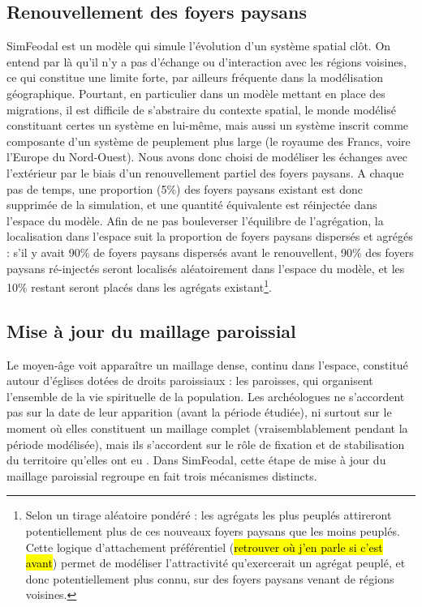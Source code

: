\subsection{Renouvellement des foyers paysans \label{meca-renouvellement}}

SimFeodal est un modèle qui simule l'évolution d'un système spatial clôt.
On entend par là qu'il n'y a pas d'échange ou d'interaction avec les régions voisines, ce qui constitue une limite forte, par ailleurs fréquente dans la modélisation géographique.
Pourtant, en particulier dans un modèle mettant en place des migrations, il est difficile de s'abstraire du contexte spatial, le monde modélisé constituant certes un système en lui-même, mais aussi un système inscrit comme composante d'un système de peuplement plus large (le royaume des Francs, voire l'Europe du Nord-Ouest).
Nous avons donc choisi de modéliser les échanges avec l'extérieur par le biais d'un renouvellement partiel des foyers paysans.
A chaque pas de temps, une proportion (5\%) des foyers paysans existant est donc supprimée de la simulation, et une quantité équivalente est réinjectée dans l'espace du modèle.
Afin de ne pas bouleverser l'équilibre de l'agrégation, la localisation dans l'espace suit la proportion de foyers paysans dispersés et agrégés : s'il y avait 90\% de foyers paysans dispersés avant le renouvellent, 90\% des foyers paysans ré-injectés seront localisés aléatoirement dans l'espace du modèle, et les 10\% restant seront placés dans les agrégats existant\footnote{
Selon un tirage aléatoire pondéré : les agrégats les plus peuplés attireront potentiellement plus de ces nouveaux foyers paysans que les moins peuplés.
Cette logique d'attachement préférentiel (\hl{retrouver où j'en parle si c'est avant}) permet de modéliser l'attractivité qu'exercerait un agrégat peuplé, et donc potentiellement plus connu, sur des foyers paysans venant de régions voisines.
}.

\subsection{Mise à jour du maillage paroissial}

Le moyen-âge voit apparaître un maillage dense, continu dans l'espace, constitué autour d'églises dotées de droits paroissiaux : les paroisses, qui organisent l'ensemble de la vie spirituelle de la population.
Les archéologues ne s'accordent pas sur la date de leur apparition (avant la période étudiée), ni surtout sur le moment où elles constituent un maillage complet (vraisemblablement pendant la période modélisée), mais ils s'accordent sur le rôle de fixation et de stabilisation du territoire qu'elles ont eu \autocite{zadora-rio_paroisses_2008}.
Dans SimFeodal, cette étape de mise à jour du maillage paroissial regroupe en fait trois mécanismes distincts.

